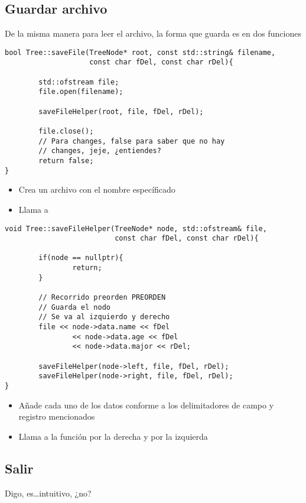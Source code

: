 \documentclass[11pt]{article}
\begin{document}
\subsection{Guardar archivo}
\label{sec:org5e9d1f2}
De la misma manera para leer el archivo, la forma
que guarda es en dos funciones
\begin{verbatim}
bool Tree::saveFile(TreeNode* root, const std::string& filename,
                    const char fDel, const char rDel){

        std::ofstream file;
        file.open(filename);

        saveFileHelper(root, file, fDel, rDel);

        file.close();
        // Para changes, false para saber que no hay
        // changes, jeje, ¿entiendes?
        return false;
}
\end{verbatim}
\begin{itemize}
\item Crea un archivo con el nombre específicado
\item Llama a
\end{itemize}
\begin{verbatim}
void Tree::saveFileHelper(TreeNode* node, std::ofstream& file,
                          const char fDel, const char rDel){

        if(node == nullptr){
                return;
        }

        // Recorrido preorden PREORDEN
        // Guarda el nodo
        // Se va al izquierdo y derecho
        file << node->data.name << fDel
                << node->data.age << fDel
                << node->data.major << rDel;

        saveFileHelper(node->left, file, fDel, rDel);
        saveFileHelper(node->right, file, fDel, rDel);
}
\end{verbatim}
\begin{itemize}
\item Añade cada uno de los datos conforme a los
delimitadores de campo y registro mencionados
\item Llama a la función por la derecha y por la izquierda
\end{itemize}
\subsection{Salir}
\label{sec:orgc856224}
Digo, es\ldots{}intuitivo, ¿no?
\end{document}
